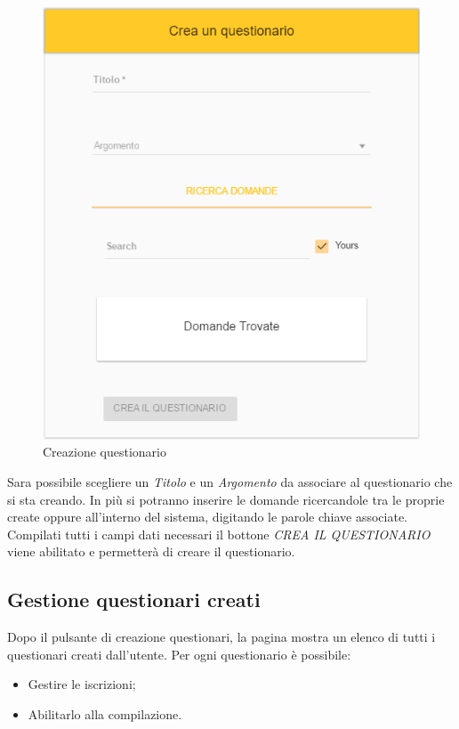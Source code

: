 \label{CreazioneQuestionari}
\begin{figure}[ht]
	\centering
	\includegraphics[scale=0.55]{img/creazione_questionario.png}
	\caption{Creazione questionario}
\end{figure}
\FloatBarrier

Sara possibile scegliere un \textit{Titolo} e un \textit{Argomento} da associare al questionario che si sta creando. In più si potranno inserire le domande ricercandole tra le proprie create oppure all'interno del sistema, digitando le parole chiave associate. Compilati tutti i campi dati necessari il bottone \textit{CREA IL QUESTIONARIO} viene abilitato e permetterà di creare il questionario. 

\newpage
\subsection{Gestione questionari creati}
Dopo il pulsante di creazione questionari, la pagina mostra un elenco di tutti i questionari creati dall'utente. Per ogni questionario è possibile:
\begin{itemize}
	\item Gestire le iscrizioni;
	\item Abilitarlo alla compilazione.
\end{itemize}

